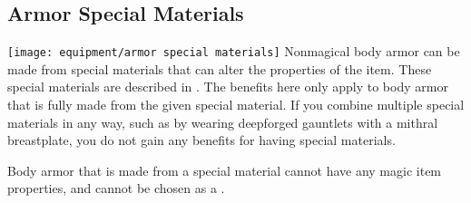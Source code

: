     \subsection{Armor Special Materials}\label{Armor Special Materials}
        \texttt{[image: equipment/armor special materials]}
        Nonmagical body armor can be made from special materials that can alter the properties of the item.
        These special materials are described in .
        The benefits here only apply to body armor that is fully made from the given special material.
        If you combine multiple special materials in any way, such as by wearing deepforged gauntlets with a mithral breastplate, you do not gain any benefits for having special materials.

        Body armor that is made from a special material cannot have any magic item properties, and cannot be chosen as a .

